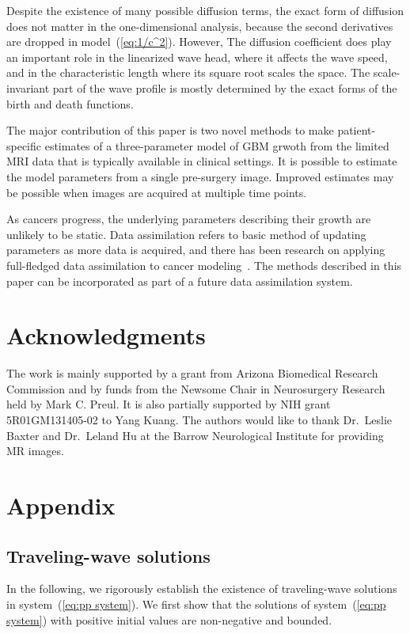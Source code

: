 \documentclass{aims}
\numberwithin{equation}{section}
\begin{document}
Despite the existence of many possible diffusion terms,
the exact form of diffusion does not matter in the one-dimensional analysis, because
the second derivatives are dropped in model~(\ref{eq:1/c^2}).  However,
The diffusion coefficient does play an important role in the linearized
wave head, where it affects the wave speed, and in the characteristic length
where its square root scales the space.  The scale-invariant
part of the wave profile is mostly determined by the exact forms of the
birth and death functions. 

The major contribution of this paper is two novel methods
to make patient-specific estimates of a three-parameter model of
GBM grwoth from the limited MRI data that is typically available in clinical settings.
It is possible to estimate the model parameters from a single pre-surgery image.
Improved estimates may be possible when images are acquired at multiple time points.

As cancers progress, the underlying parameters describing their growth are unlikely to be
static.  Data assimilation refers to basic method of updating parameters as more data is
acquired, and there has been research on applying full-fledged  data assimilation to cancer
modeling~\cite{Kostelich2011,McDaniel2013}.  The methods described in this paper can be
incorporated as part of a future data assimilation system.

\section*{Acknowledgments}
The work is mainly supported by a grant from Arizona Biomedical Research Commission
and by funds from the Newsome Chair in Neurosurgery Research held by Mark C. Preul. It is also partially supported by NIH grant 5R01GM131405-02 to Yang Kuang.
The authors would like to thank Dr.\ Leslie Baxter and Dr.\ Leland Hu at the Barrow
Neurological Institute for providing MR images.





\section*{Appendix}
\subsection*{Traveling-wave solutions}
In the following, we rigorously establish the existence of traveling-wave solutions in
system~(\ref{eq:pp system}).  We first show that the solutions of
system~(\ref{eq:pp system}) with positive initial values are non-negative and bounded.
 
\end{document}
